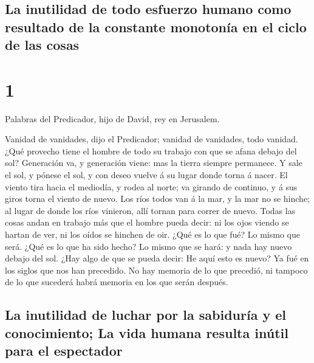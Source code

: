 \hypertarget{la-inutilidad-de-todo-esfuerzo-humano-como-resultado-de-la-constante-monotonuxeda-en-el-ciclo-de-las-cosas}{%
\subsection{La inutilidad de todo esfuerzo humano como resultado de la
constante monotonía en el ciclo de las
cosas}\label{la-inutilidad-de-todo-esfuerzo-humano-como-resultado-de-la-constante-monotonuxeda-en-el-ciclo-de-las-cosas}}

\hypertarget{section}{%
\section{1}\label{section}}

 Palabras del Predicador, hijo de David, rey en Jerusalem.

 Vanidad de vanidades, dijo el Predicador; vanidad de
vanidades, todo vanidad.  ¿Qué provecho tiene el hombre de
todo su trabajo con que se afana debajo del sol? 
Generación va, y generación viene: mas la tierra siempre permanece.
 Y sale el sol, y pónese el sol, y con deseo vuelve á su
lugar donde torna á nacer.  El viento tira hacia el
mediodía, y rodea al norte; va girando de continuo, y á sus giros torna
el viento de nuevo.  Los ríos todos van á la mar, y la mar
no se hinche; al lugar de donde los ríos vinieron, allí tornan para
correr de nuevo.  Todas las cosas andan en trabajo más que
el hombre pueda decir: ni los ojos viendo se hartan de ver, ni los oídos
se hinchen de oir.  ¿Qué es lo que fué? Lo mismo que será.
¿Qué es lo que ha sido hecho? Lo mismo que se hará: y nada hay nuevo
debajo del sol.  ¿Hay algo de que se pueda decir: He aquí
esto es nuevo? Ya fué en los siglos que nos han precedido.
 No hay memoria de lo que precedió, ni tampoco de lo que
sucederá habrá memoria en los que serán después.

\hypertarget{la-inutilidad-de-luchar-por-la-sabiduruxeda-y-el-conocimiento-la-vida-humana-resulta-inuxfatil-para-el-espectador}{%
\subsection{La inutilidad de luchar por la sabiduría y el conocimiento;
La vida humana resulta inútil para el
espectador}\label{la-inutilidad-de-luchar-por-la-sabiduruxeda-y-el-conocimiento-la-vida-humana-resulta-inuxfatil-para-el-espectador}}

